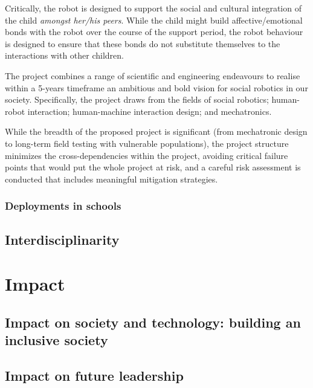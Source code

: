 \documentclass[]{article}
\begin{document}
Critically, the robot is designed to support the social and cultural
integration of the child \emph{amongst her/his peers}. While the child
might build affective/emotional bonds with the robot over the course of
the support period, the robot behaviour is designed to ensure that these
bonds do not substitute themselves to the interactions with other
children.

The project combines a range of scientific and engineering endeavours to
realise within a 5-years timeframe an ambitious and bold vision for
social robotics in our society. Specifically, the project draws from the
fields of social robotics; human-robot interaction; human-machine
interaction design; and mechatronics.

While the breadth of the proposed project is significant (from
mechatronic design to long-term field testing with vulnerable
populations), the project structure minimizes the cross-dependencies
within the project, avoiding critical failure points that would put the
whole project at risk, and a careful risk assessment is conducted that
includes meaningful mitigation strategies.

\hypertarget{deployments-in-schools}{%
\subsubsection{Deployments in schools}\label{deployments-in-schools}}

\hypertarget{interdisciplinarity}{%
\subsection{Interdisciplinarity}\label{interdisciplinarity}}

\hypertarget{impact}{%
\section{Impact}\label{impact}}

\hypertarget{impact-on-society-and-technology-building-an-inclusive-society}{%
\subsection{Impact on society and technology: building an inclusive
society}\label{impact-on-society-and-technology-building-an-inclusive-society}}

\hypertarget{impact-on-future-leadership}{%
\subsection{Impact on future
leadership}\label{impact-on-future-leadership}}
\end{document}
